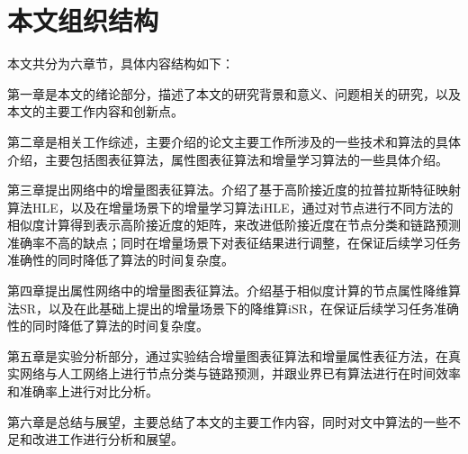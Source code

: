 \section{本文组织结构}

本文共分为六章节，具体内容结构如下：

第一章是本文的绪论部分，描述了本文的研究背景和意义、问题相关的研究，以及本文的主要工作内容和创新点。

第二章是相关工作综述，主要介绍的论文主要工作所涉及的一些技术和算法的具体介绍，主要包括图表征算法，属性图表征算法和增量学习算法的一些具体介绍。

第三章提出网络中的增量图表征算法。介绍了基于高阶接近度的拉普拉斯特征映射算法HLE，以及在增量场景下的增量学习算法iHLE，通过对节点进行不同方法的相似度计算得到表示高阶接近度的矩阵，来改进低阶接近度在节点分类和链路预测准确率不高的缺点；同时在增量场景下对表征结果进行调整，在保证后续学习任务准确性的同时降低了算法的时间复杂度。

第四章提出属性网络中的增量图表征算法。介绍基于相似度计算的节点属性降维算法SR，以及在此基础上提出的增量场景下的降维算iSR，在保证后续学习任务准确性的同时降低了算法的时间复杂度。

第五章是实验分析部分，通过实验结合增量图表征算法和增量属性表征方法，在真实网络与人工网络上进行节点分类与链路预测，并跟业界已有算法进行在时间效率和准确率上进行对比分析。

第六章是总结与展望，主要总结了本文的主要工作内容，同时对文中算法的一些不足和改进工作进行分析和展望。
